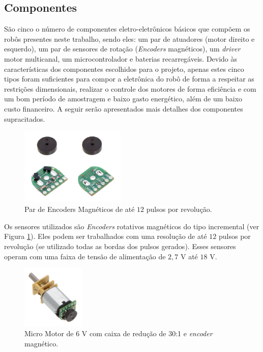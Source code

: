 \subsection{Componentes}
\label{subsec:componentes}

São cinco o número de componentes eletro-eletrônicos básicos que compõem os robôs presentes neste trabalho, sendo eles: um par de atuadores (motor direito e esquerdo), um par de sensores de rotação (\textit{Encoders} magnéticos), um \emph{driver} motor multicanal, um microcontrolador e baterias recarregáveis. Devido às características dos componentes escolhidos para o projeto, apenas estes cinco tipos foram suficientes para compor a eletrônica do robô de forma a respeitar as restrições dimensionais, realizar o controle dos motores de forma eficiência e com um bom período de amostragem e baixo gasto energético, além de um baixo custo financeiro. A seguir serão apresentados mais detalhes dos componentes supracitados.\\

\begin{figure}[H]
    \centering
    \includegraphics[width=5cm]{figuras/eletronica/encoder_frente_verso.jpg}
    \caption{Par de Encoders Magnéticos de até $12$ pulsos por revolução.}
    \label{fig:encoder}
\end{figure}

Os sensores utilizados são \emph{Encoders} rotativos magnéticos do tipo incremental (ver Figura \ref{fig:encoder}). Eles podem ser trabalhados com uma resolução de até $12$ pulsos por revolução (se utilizado todas as bordas dos pulsos gerados). Esses sensores operam com uma faixa de tensão de alimentação de $2,7$ V até $18$ V.\\

\begin{figure}[H]
    \centering
    \includegraphics[width=3cm]{figuras/eletronica/motor_com_encoder.jpg}
    \caption{Micro Motor de 6 V com caixa de redução de 30:1 e \textit{encoder} magnético.}
    \label{fig:motor_com_encoder}
\end{figure}

